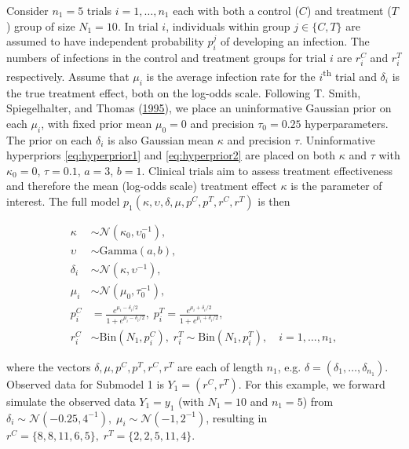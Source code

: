 \documentclass[11pt,]{book}
\begin{document}
Consider \(n_1 = 5\) trials \(i = 1, \ldots, n_1\) each with both a
control (\(C\)) and treatment (\(T\)) group of size \(N_1 = 10\). In
trial \(i\), individuals within group \(j \in \{C, T\}\) are assumed to
have independent probability \(p_i^j\) of developing an infection. The
numbers of infections in the control and treatment groups for trial
\(i\) are \(r_i^C\) and \(r_i^T\) respectively. Assume that \(\mu_i\) is
the average infection rate for the \(i\)\textsuperscript{th} trial and
\(\delta_i\) is the true treatment effect, both on the log-odds scale.
Following T. Smith, Spiegelhalter, and Thomas
(\protect\hyperlink{ref-smith1995bayesian}{1995}), we place an
uninformative Gaussian prior on each \(\mu_i\), with fixed prior mean
\(\mu_0 = 0\) and precision \(\tau_0 = 0.25\) hyperparameters. The prior
on each \(\delta_i\) is also Gaussian mean \(\kappa\) and precision
\(\tau\). Uninformative hyperpriors \eqref{eq:hyperprior1} and
\eqref{eq:hyperprior2} are placed on both \(\kappa\) and \(\tau\) with
\(\kappa_0 = 0\), \(\tau = 0.1\), \(a = 3\), \(b = 1\). Clinical trials
aim to assess treatment effectiveness and therefore the mean (log-odds
scale) treatment effect \(\kappa\) is the parameter of interest. The
full model \(p_1(\kappa, \upsilon, \delta, \mu, p^C, p^T, r^C, r^T)\) is
then

\begin{align}
\kappa &\sim \mathcal{N}(\kappa_0, \upsilon_0^{-1}), \label{eq:hyperprior1} \\
\upsilon &\sim \text{Gamma}(a, b), \label{eq:hyperprior2} \\
\delta_i &\sim \mathcal{N}(\kappa, \upsilon^{-1}), \\
\mu_i &\sim \mathcal{N}(\mu_0, \tau_0^{-1}), \\
p_i^C &= \frac{e^{\mu_i - \delta_i/2}}{1 + e^{\mu_i - \delta_i/2}}, \; p_i^T = \frac{e^{\mu_i + \delta_i/2}}{1 + e^{\mu_i + \delta_i/2}}, \\
r_i^C &\sim \text{Bin}(N_1, p_i^C), \; r_i^T \sim \text{Bin}(N_1, p_i^T), \quad i = 1, \ldots, n_1,
\end{align}

where the vectors \(\delta, \mu, p^C, p^T, r^C, r^T\) are each of length
\(n_1\), e.g. \(\delta = (\delta_1, \ldots, \delta_{n_1})\). Observed
data for Submodel 1 is \(Y_1 = (r^C, r^T)\). For this example, we
forward simulate the observed data \(Y_1 = y_1\) (with \(N_1 = 10\) and
\(n_1 = 5\)) from
\(\delta_i \sim \mathcal{N}(-0.25, 4^{-1}), \; \mu_i \sim \mathcal{N}(-1, 2^{-1})\),
resulting in
\(r^C = \{8, 8, 11, 6, 5 \}, \; r^T = \{2, 2, 5, 11, 4 \}\).
\end{document}
